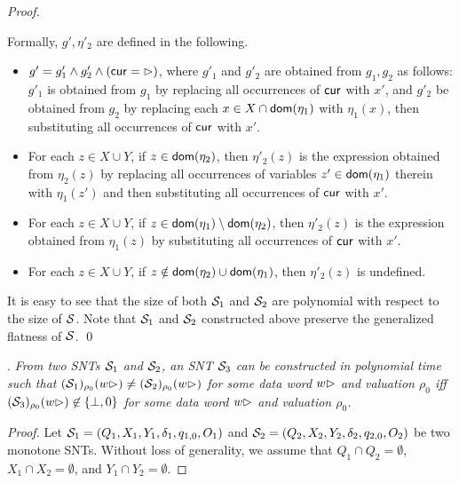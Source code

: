 \begin{appendix}
\begin{proof}
\begin{itemize}
\begin{itemize}
	Formally, $g',\eta'_2$ are defined in the following. 
		\begin{itemize}
		\item $g' = g'_1 \wedge g'_2 \wedge(\mathsf{cur}=\rhd)$, where $g'_1$ and $g'_2$ are obtained from $g_1,g_2$ as follows: $g'_1$ is obtained from $g_1$ by replacing all occurrences of $\mathsf{cur}$ with $x'$, and $g'_2$ be obtained from $g_2$ by replacing each $x \in X\cap \mathsf{dom}(\eta_1)$ with $\eta_1(x)$, then substituting all occurrences of $\mathsf{cur}$ with $x'$.
		\item For each $z \in X\cup Y$, if $z \in \mathsf{dom}(\eta_2)$, then $\eta'_2(z)$ is the expression obtained from $\eta_2(z)$ by replacing all occurrences of variables $z' \in \mathsf{dom}(\eta_1)$ therein with $\eta_1(z')$ and then substituting all occurrences of $\mathsf{cur}$ with $x'$. 
		\item For each $z \in X\cup Y$, if $z \in \mathsf{dom}(\eta_1) \setminus \mathsf{dom}(\eta_2)$, then $\eta'_2(z)$ is the expression obtained from $\eta_1(z)$ by substituting all occurrences of $\mathsf{cur}$ with $x'$.
		\item For each $z \in X\cup Y$, if $z \notin \mathsf{dom}(\eta_2) \cup \mathsf{dom}(\eta_1)$, then $\eta'_2(z)$ is undefined.

		\end{itemize}
	\end{itemize}
\end{itemize}

It is easy to see that the size of both ${\mathcal{S} }_1$ and ${\mathcal{S} }_2$ are polynomial with respect to the size of ${\mathcal{S} }$.
Note that ${\mathcal{S} }_1$ and ${\mathcal{S} }_2$ constructed above preserve the generalized flatness of ${\mathcal{S} }$.
\qed
\end{proof}


.
\emph{From two SNTs ${\mathcal{S} }_1$ and ${\mathcal{S} }_2$, an SNT ${\mathcal{S} }_3$ can be constructed in polynomial time such that  $({\mathcal{S} }_1)_{\rho_0}(w\rhd) \neq ({\mathcal{S} }_2)_{\rho_0}(w\rhd)$ for some  data word $w \rhd$ and valuation $\rho_0$  iff $({\mathcal{S} }_3)_{\rho_0}(w\rhd) \not\in \{\bot,0\}$ for some data word $w\rhd$ and valuation $\rho_0$.}

\begin{proof}
Let ${\mathcal{S} }_1 = (Q_1,X_1,Y_1,\delta_1,q_{1,0}, O_1)$ and  ${\mathcal{S} }_2 = (Q_2,X_2,Y_2,\delta_2,q_{2,0}, O_2)$ be two monotone SNTs. Without loss of generality, we assume that $Q_1 \cap Q_2 = \emptyset$, $X_1 \cap X_2 = \emptyset$, and $Y_1 \cap Y_2 = \emptyset$. 


\end{proof}
\end{appendix}
